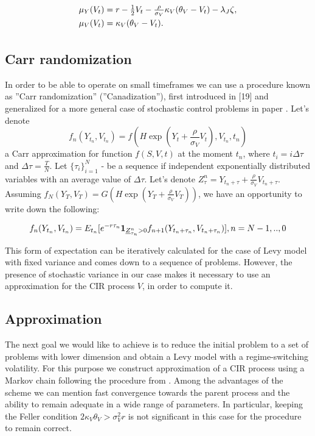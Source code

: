 \documentclass[a4paper]{jpconf}
\begin{document}
\begin{equation*}
\begin{array}{l}
\mu_Y(V_t) = r - \frac{1}{2}V_t - \frac{\rho}{\sigma_V}\kappa_V(\theta_V - V_t)  - \lambda_J \zeta,
\smallskip\\
\mu_V(V_t) = \kappa_V(\theta_V - V_t).
\smallskip\\
\end{array}
\end{equation*}

\subsection{Carr randomization}


In order to be able to operate on small timeframes we can use a procedure known as ''Carr randomization'' (''Canadization''), first introduced in [19] and generalized for a more general case of stochastic control problems in paper \cite{touzi}. Let's denote 
$$f_{n}({Y}_{t_n}, {V}_{t_n}) = f(H\exp(Y_t + \frac{\rho}{\sigma_V}V_t), {V}_{t_n}, t_n)$$
a Carr approximation for function $f(S,V,t)$ at the moment $t_n$, where $t_i = i \Delta \tau$ and $\Delta \tau = \frac{T}{N}$. Let $\{\tau_i\}_{i=1}^N$ - be a sequence if independent exponentially distributed variables with an average value of $\Delta \tau$. Let's denote $Z_\tau^n=Y_{t_n + \tau}+\frac{\rho}{\sigma_V}V_{t_n + \tau}$.
Assuming $f_{N}(Y_T, V_T)=G(H\exp (Y_T+\frac{\rho}{\sigma_V}V_T ))$, we have an opportunity to write down the following:

$$
f_{n}({Y}_{t_n}, {V}_{t_n}) = E_{t_{n}} [ e^{-r\tau_n}  
{\bf 1}_{\underline{Z}^n_{\tau_n} > 0} f_{n+1}(Y_{t_n+\tau_n},V_{t_n+\tau_n})], \smallskip\\ n = N-1,..,0 
$$

This form of expectation can be iteratively calculated for the case of Levy model with fixed variance and comes down to a sequence of problems. However, the presence of stochastic variance in our case makes it necessary to use an approximation for the CIR process $V$, in order to compute it.

\subsection{Approximation}

The next goal we would like to achieve is to reduce the initial problem to a set of problems with lower dimension and obtain a Levy model with a regime-switching volatility. For this purpose we construct approximation of a CIR process using a Markov chain following the procedure from \cite{zanette_tree}. Among the advantages of the scheme we can mention fast convergence towards the parent process and the ability to remain adequate in a wide range of parameters. In particular, keeping the Feller condition $2\kappa_V\theta_V>\sigma_V^2r$ is not significant in this case for the procedure to remain correct.
\end{document}
